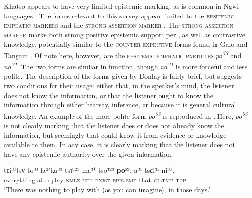 Khatso \cite[Ngwi-Burmese: PRC,][]{Donlay2019} appears to have very limited epistemic marking, as is common in Ngwi languages \cite{Gerner2013}. The forms relevant to this survey appear limited to the \textsc{epsitemic emphatic markers} and the \textsc{strong assertion marker} \cite[437]{Donlay2019}. The \textsc{strong assertion marker} marks both strong positive epistemic support per , as well as contrastive knowledge, potentially similar to the \textsc{counter-expective} forms found in Galo and Tangam \cites[Tani: India,][]{Post2007}{Post2017a}. Of note here, however, are the \textsc{epsitemic emphatic particles} \textit{po\textsuperscript{53}} and \textit{na\textsuperscript{31}}. The two forms are similar in function, though \textit{na\textsuperscript{31}} is more forceful and less polite. The description of the forms given by Donlay is fairly brief, but suggests two conditions for their usage: either that, in the speaker's mind, the listener does not know the information, or that the listener ought to know the information through either hearsay, inference, or because it is general cultural knowledge. An example of the more polite form \textit{po\textsuperscript{53}} is reproduced in . Here, \textit{po\textsuperscript{53}} is not clearly marking that the listener does or does not already know the information, but seemingly that could know it from evidence or knowledge available to them. In any case, it is clearly marking that the listener does not have any epistemic authority over the given information.

\begin{exe}
        
        \ex \label{e:Description:KhatsoEmphaticPo}
        \gll  tɛi³¹tsv̩ to³³ la²⁴ka³³ tsɿ³²³ ma³¹ tso³²³ \textbf{po⁵³}, a³³ tsɛi³⁵ ni³¹. \\
        everything also play \textsc{nmlz} \textsc{neg} \textsc{exist} \textsc{epis.emp} that \textsc{cl:tmp} \textsc{top} \\
        \glt  `There was nothing to play with (as you can imagine), in those days.' \\
        \cite[Khatso,][440]{Donlay2019}
\end{exe}


